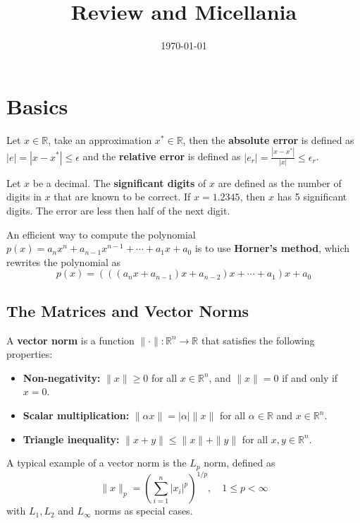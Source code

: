 \documentclass{matharticle}
\title{Review and Micellania}
\author{}
\date{\today}
\begin{document}
\maketitle
\section{Basics}
\begin{definition}
	Let $x\in \mathbb{R}$, take an approximation $x^*\in \mathbb{R}$, then the \textbf{absolute error} is defined as $|e|=|x-x^*| \leq \epsilon$ and the \textbf{relative error} is defined as $|e_r|=\frac{|x-x^*|}{|x|} \leq \epsilon_r$.

	Let $x$ be a decimal. The \textbf{significant digits} of $x$ are defined as the number of digits in $x$ that are known to be correct. If $x = 1.2345$, then $x$ has 5 significant digits. The error are less then half of the next digit.
\end{definition}

An efficient way to compute the polynomial $p(x) = a_n x^n + a_{n-1} x^{n-1} + \cdots + a_1 x + a_0$ is to use \textbf{Horner's method}, which rewrites the polynomial as
\begin{equation}
	p(x) = (((a_n x + a_{n-1}) x + a_{n-2}) x + \cdots + a_1) x + a_0
\end{equation}

\subsection{The Matrices and Vector Norms}
\begin{definition}
	A \textbf{vector norm} is a function $\|\cdot\|: \mathbb{R}^n \to \mathbb{R}$ that satisfies the following properties:
	\begin{itemize}
		\item \textbf{Non-negativity:} $\|x\| \geq 0$ for all $x \in \mathbb{R}^n$, and $\|x\| = 0$ if and only if $x = 0$.
		\item \textbf{Scalar multiplication:} $\|\alpha x\| = |\alpha| \|x\|$ for all $\alpha \in \mathbb{R}$ and $x \in \mathbb{R}^n$.
		\item \textbf{Triangle inequality:} $\|x + y\| \leq \|x\| + \|y\|$ for all $x, y \in \mathbb{R}^n$.
	\end{itemize}
\end{definition}
A typical example of a vector norm is the $L_p$ norm, defined as
\begin{equation}
	\|x\|_p = \left( \sum_{i=1}^{n} |x_i|^p \right)^{1/p}, \quad 1 \leq p < \infty
\end{equation}
with $L_1, L_2$ and $L_\infty$ norms as special cases.
\end{document}
